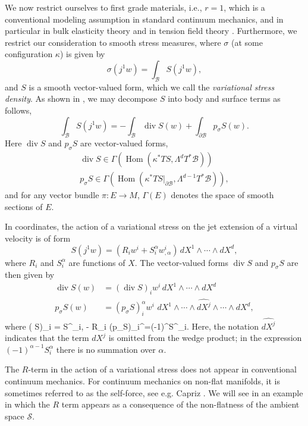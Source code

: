 \documentclass[smallextended]{svjour3}
\begin{document}
We now restrict ourselves to first grade materials, i.e., $r=1$, which is a conventional modeling assumption in standard continuum mechanics, and in particular in bulk elasticity theory and in tension field theory \cite{Ste90}. Furthermore, we restrict our consideration to smooth stress measures, where $\sigma$ (at some configuration $\kappa$) is given by 
\[
\sigma(j^1w)=\int_{\mathcal{B}} S(j^1w),
\]
and $S$ is a smooth vector-valued form, which we call the \emph{variational stress density}. 
As shown in \cite{Seg02,Seg13}, we may decompose $S$ into body and surface terms as follows,
\[
\int_{\mathcal{B}} S(j^1w)= - \int_{\mathcal{B}} \operatorname{div} S(w)+\int_{\partial{\mathcal{B}}} p_\sigma S(w).
\]
Here $\operatorname{div} S$ and $p_\sigma S$ are vector-valued forms,
\[
\begin{gathered}
\operatorname{div} S \in \Gamma({\operatorname{Hom}}({\kappa^*TS},\Lambda^dT^*{\mathcal{B}})) \\
p_\sigma S \in \Gamma({\operatorname{Hom}}({\kappa^*TS}|_{\partial{\mathcal{B}}},\Lambda^{d-1}T^*{\mathcal{B}}) ),
\end{gathered}
\]
and for any vector bundle $\pi:E\to M$, $\Gamma(E)$ denotes the space of smooth sections of $E$.

In coordinates, the action of a variational stress on the jet extension of a virtual velocity is of form 
\[
S(j^1w) = (R_i w^i + S_i^\alpha w^i_{,\alpha})\, dX^1\wedge\cdots\wedge dX^d,
\]
where $R_i$ and $S_i^\alpha$ are functions of $X$. The vector-valued forms $\operatorname{div} S$ and $p_\sigma S$ are then given by
\[
\begin{split}
\operatorname{div} S(w) &= (\operatorname{div} S)_i w^i\, dX^1\wedge\cdots\wedge dX^d \\
p_\sigma S(w) &= (p_\sigma S)^\alpha_i w^i\,  \,dX^1\wedge\cdots\wedge \widehat{dX^j}\wedge\cdots\wedge dX^d ,
\end{split}
\]
where
\beq
\label{eq:divS}
( S)_i = S^\alpha_{i,\alpha} - R_i
\Textand 
(p_\sigma S)_i^\alpha =(-1)^{}S^\alpha_i.
\eeq
Here, the notation $\widehat{dX^j}$ indicates that the term $dX^j$ is omitted from the wedge product;
 in the expression $(-1)^{\alpha-1}S^\alpha_i$ there is no summation over $\alpha$.

The $R$-term in the action of a variational stress does not appear in conventional continuum mechanics. For continuum mechanics on non-flat manifolds, it is sometimes referred to as the self-force, see e.g. Capriz \cite{Cap89}. We will see in  an example in which the $R$ term appears as a consequence of the non-flatness of the ambient space ${\mathcal{S}}$.  
\end{document}

